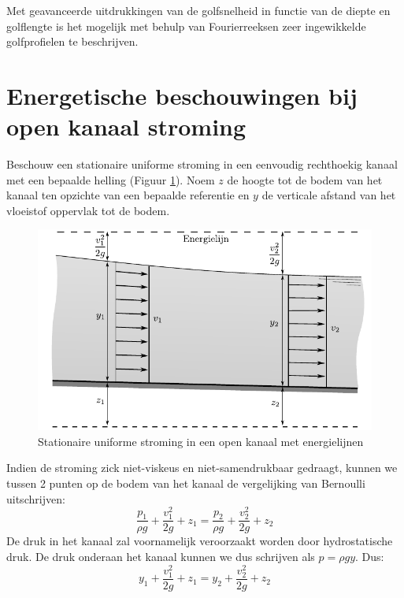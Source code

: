 Met geavanceerde uitdrukkingen van de golfsnelheid in functie van de diepte en golflengte is het mogelijk met behulp van Fourierreeksen zeer ingewikkelde golfprofielen te beschrijven.

	\section{Energetische beschouwingen bij open kanaal stroming}
	\label{sec:Energetische beschouwingen bij open kanaal stroming}
Beschouw een stationaire uniforme stroming in een eenvoudig rechthoekig kanaal met een bepaalde helling (Figuur \ref{fig:Open_kanaal_bernoulli}). Noem $z$ de hoogte tot de bodem van het kanaal ten opzichte van een bepaalde referentie en $y$ de verticale afstand van het vloeistof oppervlak tot de bodem.
\begin{figure}[htb]
	\centering
	\includegraphics{fig/kanaalstroming/Open_kanaal_bernoulli}
	\caption{Stationaire uniforme stroming in een open kanaal met energielijnen}
	\label{fig:Open_kanaal_bernoulli}
\end{figure}
Indien de stroming zick niet-viskeus en niet-samendrukbaar gedraagt, kunnen we tussen 2 punten op de bodem van het kanaal de vergelijking van Bernoulli uitschrijven:
\begin{equation}
	\frac{p_1}{\rho g} + \frac{v_1^2}{2 g} + z_1 = \frac{p_2}{\rho g} + \frac{v_2^2}{2 g} + z_2
\end{equation}
De druk in het kanaal zal voornamelijk veroorzaakt worden door hydrostatische druk. De druk onderaan het kanaal kunnen we dus schrijven als $p = \rho g y$. Dus:
\begin{equation}
	y_1 + \frac{v_1^2}{2 g} + z_1 = y_2 + \frac{v_2^2}{2 g} + z_2
\end{equation}
